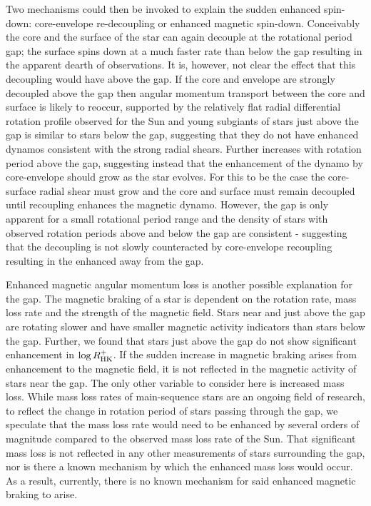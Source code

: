Two mechanisms could then be invoked to explain the sudden enhanced spin-down: core-envelope re-decoupling or enhanced magnetic spin-down.
Conceivably the core and the surface of the star can again decouple at the rotational period gap; the surface spins down at a much faster rate than below the gap resulting in the apparent dearth of observations.
It is, however, not clear the effect that this decoupling would have above the gap.
If the core and envelope are strongly decoupled above the gap then angular momentum transport between the core and surface is likely to reoccur, supported by the relatively flat radial differential rotation profile observed for the Sun and young subgiants \citep{deheuvels_seismic_2015}
\rper{} of stars just above the gap is similar to stars below the gap, suggesting that they do not have enhanced dynamos consistent with the strong radial shears.
Further \rper{} increases with rotation period above the gap, suggesting instead that the enhancement of the dynamo by core-envelope should grow as the star evolves.
For this to be the case the core-surface radial shear must grow and the core and surface must remain decoupled until recoupling enhances the magnetic dynamo.
However, the gap is only apparent for a small rotational period range and the density of stars with observed rotation periods above and below the gap are consistent - suggesting that the decoupling is not slowly counteracted by core-envelope recoupling resulting in the enhanced \rper{} away from the gap.

Enhanced magnetic angular momentum loss is another possible explanation for the gap.
The magnetic braking of a star is dependent on the rotation rate, mass loss rate and the strength of the magnetic field.
Stars near and just above the gap are rotating slower and have smaller magnetic activity indicators than stars below the gap.
Further, we found that stars just above the gap do not show significant enhancement in $\log R^{+}_{\rm{HK}}$.
If the sudden increase in magnetic braking arises from enhancement to the magnetic field, it is not reflected in the magnetic activity of stars near the gap.
The only other variable to consider here is increased mass loss.
While mass loss rates of main-sequence stars are an ongoing field of research, to reflect the change in rotation period of stars passing through the gap, we speculate that the mass loss rate would need to be enhanced by several orders of magnitude compared to the observed mass loss rate of the Sun. 
That significant mass loss is not reflected in any other measurements of stars surrounding the gap, nor is there a known mechanism by which the enhanced mass loss would occur.
As a result, currently, there is no known mechanism for said enhanced magnetic braking to arise.


